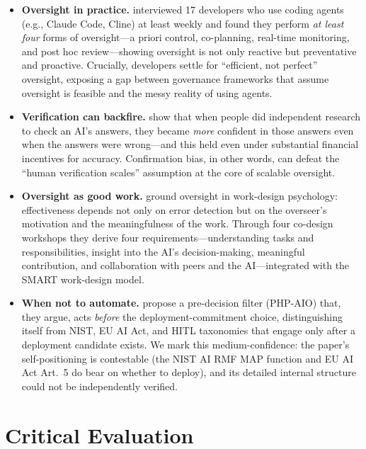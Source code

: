 \documentclass[11pt]{article}
\begin{document}
\begin{itemize}[leftmargin=*,itemsep=3pt]
  \item \textbf{Oversight in practice.} \citet{dhanorkar2026} interviewed 17 developers who
        use coding agents (e.g., Claude Code, Cline) at least weekly and found they perform
        \emph{at least four} forms of oversight---a priori control, co-planning, real-time
        monitoring, and post hoc review---showing oversight is not only reactive but
        preventative and proactive. Crucially, developers settle for ``efficient, not
        perfect'' oversight, exposing a gap between governance frameworks that assume
        oversight is feasible and the messy reality of using agents.
  \item \textbf{Verification can backfire.} \citet{recchia2025} show that when people did
        independent research to check an AI's answers, they became \emph{more} confident in
        those answers even when the answers were wrong---and this held even under
        substantial financial incentives for accuracy. Confirmation bias, in other words,
        can defeat the ``human verification scales'' assumption at the core of scalable
        oversight.
  \item \textbf{Oversight as good work.} \citet{faas2025} ground oversight in work-design
        psychology: effectiveness depends not only on error detection but on the overseer's
        motivation and the meaningfulness of the work. Through four co-design workshops they
        derive four requirements---understanding tasks and responsibilities, insight into
        the AI's decision-making, meaningful contribution, and collaboration with peers and
        the AI---integrated with the SMART work-design model.
  \item \textbf{When not to automate.} \citet{delachica2026} propose a pre-decision filter
        (PHP-AIO) that, they argue, acts \emph{before} the deployment-commitment choice,
        distinguishing itself from NIST, EU AI Act, and HITL taxonomies that engage only
        after a deployment candidate exists. We mark this medium-confidence: the paper's
        self-positioning is contestable (the NIST AI RMF MAP function and EU AI Act Art.~5
        do bear on whether to deploy), and its detailed internal structure could not be
        independently verified.
\end{itemize}

\section{Critical Evaluation}
\label{sec:critique}
\end{document}
